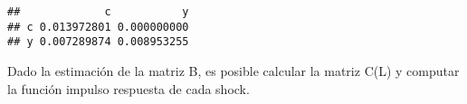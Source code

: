 \documentclass[
]{book}
\newenvironment{Shaded}{\begin{snugshade}}{\end{snugshade}}
\newcommand{\AttributeTok}[1]{\textcolor[rgb]{0.77,0.63,0.00}{#1}}
\newcommand{\ConstantTok}[1]{\textcolor[rgb]{0.00,0.00,0.00}{#1}}
\newcommand{\DecValTok}[1]{\textcolor[rgb]{0.00,0.00,0.81}{#1}}
\newcommand{\FunctionTok}[1]{\textcolor[rgb]{0.00,0.00,0.00}{#1}}
\newcommand{\NormalTok}[1]{#1}
\newcommand{\OtherTok}[1]{\textcolor[rgb]{0.56,0.35,0.01}{#1}}
\newcommand{\SpecialCharTok}[1]{\textcolor[rgb]{0.00,0.00,0.00}{#1}}
\newcommand{\StringTok}[1]{\textcolor[rgb]{0.31,0.60,0.02}{#1}}
\begin{document}
\begin{Shaded}
\end{Shaded}

\begin{verbatim}
##             c           y
## c 0.013972801 0.000000000
## y 0.007289874 0.008953255
\end{verbatim}

Dado la estimación de la matriz B, es posible calcular la matriz C(L) y computar la función impulso respuesta de cada shock.
\end{document}

